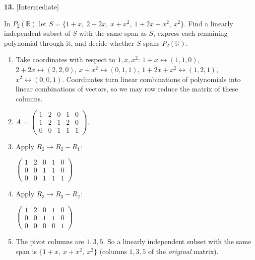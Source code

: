 \documentclass[11pt]{article}
\begin{document}
\par\vspace{2pt}
\begin{minipage}{\linewidth}\textbf{13.} \hfill{\scriptsize\color{ink}[Intermediate]}\par\nopagebreak In $P_2(\mathbb{R})$ let $S=\{1+x,\ 2+2x,\ x+x^{2},\ 1+2x+x^{2},\ x^{2}\}$. Find a linearly independent subset of $S$ with the same span as $S$, express each remaining polynomial through it, and decide whether $S$ spans $P_2(\mathbb{R})$.
\end{minipage}\par\nopagebreak
\begin{tcolorbox}[breakable,colback=ans,colframe=ansb,boxrule=0.5pt,left=4pt,right=4pt,top=2pt,bottom=2pt]\begin{enumerate}[leftmargin=3.1em,itemsep=1pt,topsep=1pt,label=\textbf{Step \arabic*.}]\item Take coordinates with respect to $1,x,x^{2}$: $1+x\leftrightarrow(1,1,0)$, $2+2x\leftrightarrow(2,2,0)$, $x+x^{2}\leftrightarrow(0,1,1)$, $1+2x+x^{2}\leftrightarrow(1,2,1)$, $x^{2}\leftrightarrow(0,0,1)$. Coordinates turn linear combinations of polynomials into linear combinations of vectors, so we may row reduce the matrix of these columns.
\item $A=\begin{pmatrix}1 & 2 & 0 & 1 & 0 \\ 1 & 2 & 1 & 2 & 0 \\ 0 & 0 & 1 & 1 & 1\end{pmatrix}$.
\item Apply $R_2\to R_2-R_1$:\par\smallskip $\displaystyle \begin{pmatrix}1 & 2 & 0 & 1 & 0 \\ 0 & 0 & 1 & 1 & 0 \\ 0 & 0 & 1 & 1 & 1\end{pmatrix}$
\item Apply $R_3\to R_3-R_2$:\par\smallskip $\displaystyle \begin{pmatrix}1 & 2 & 0 & 1 & 0 \\ 0 & 0 & 1 & 1 & 0 \\ 0 & 0 & 0 & 0 & 1\end{pmatrix}$
\item The pivot columns are $1,3,5$. So a linearly independent subset with the same span is $\{1+x,\ x+x^{2},\ x^{2}\}$ (columns $1,3,5$ of the \emph{original} matrix).

\end{enumerate}
\end{tcolorbox}
\end{document}
